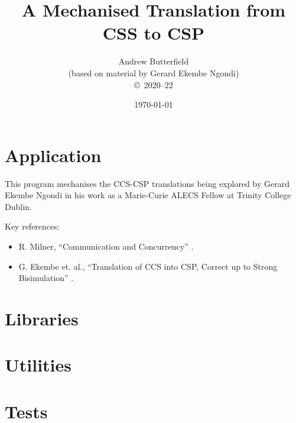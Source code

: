 \documentclass[fleqn,10pt]{report}
\author{
Andrew Butterfield
\\(based on material by Gerard Ekembe Ngondi)
\\
{\small \copyright\ 2020--22}
}
\title{
  A Mechanised Translation from CSS to CSP
}
\date{
\today
}
\begin{document}
\maketitle
\setcounter{tocdepth}{4}
\tableofcontents


\chapter{Application}

This program mechanises the CCS-CSP translations
being explored by Gerard Ekembe Ngondi
in his work as a Marie-Curie ALECS Fellow at Trinity College Dublin.

Key references:
\begin{itemize}
  \item R. Milner, ``Communication and Concurrency''
  \cite{Comm:Concur:Milner:89}.
  \item G. Ekembe et. al., ``Translation of CCS into CSP, Correct up to
Strong Bisimulation'' \cite{DBLP:conf/sefm/NgondiKB21}.
\end{itemize}

\newpage

\chapter{Libraries}

\newpage
\newpage
\newpage

\appendix

\chapter{Utilities}

\newpage


\chapter{Tests}

\newpage

% 



\end{document}
